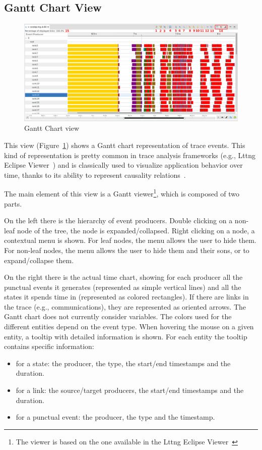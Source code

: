 \documentclass[twoside]{article}
\begin{document}
\begin{sloppypar}
\subsection{Gantt Chart View}
\label{subsec:gantt}

\begin{figure}[h!]
  \centering
    \includegraphics[width=1.0\textwidth]{images/gantt.png}
  \caption{Gantt Chart view}
  \label{fig:gantt}
\end{figure}

This view (Figure~\ref{fig:gantt}) shows a Gantt chart representation of trace events.
This kind of representation is pretty common in trace analysis frameworks (e.g., Lttng Eclipse Viewer~\cite{lttng_viewer}) and is classically used to visualize application behavior over time, thanks to its ability to represent causality relations~\cite{wilson_gantt_2003}.

The main element of this view is a Gantt viewer\footnote{The viewer is based on the one available in the Lttng Eclipse Viewer~\cite{lttng_viewer}}, which is composed of two parts.

On the left there is the hierarchy of event producers. 
Double clicking on a non-leaf node of the tree, the node is expanded/collapsed.
Right clicking on a node, a contextual menu is shown. 
For leaf nodes, the menu allows the user to hide them.
For non-leaf nodes, the menu allows the user to hide them and their sons, or to expand/collapse them.

On the right there is the actual time chart, showing for each producer all the punctual events it generates (represented as simple vertical lines) and all the states it spends time in (represented as colored rectangles). 
If there are links in the trace (e.g., communications), they are represented as oriented arrows.
The Gantt chart does not currently consider variables.
The colors used for the different entities depend on the event type.
When hovering the mouse on a given entity, a tooltip with detailed information is shown.
For each entity the tooltip contains specific information:
\begin{itemize}
 \item for a state: the producer, the type, the start/end timestamps and the duration.
 \item for a link: the source/target producers, the start/end timestamps and the duration.
 \item for a punctual event: the producer, the type and the timestamp.
\end{itemize}


\end{sloppypar}
\end{document}
